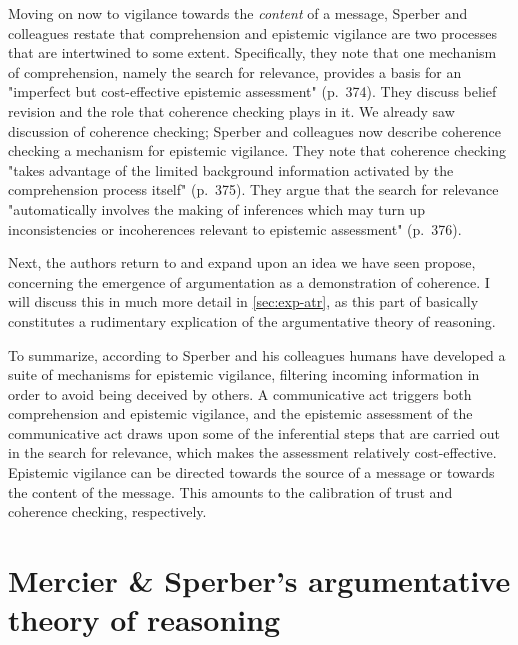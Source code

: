 
Moving on now to vigilance towards the \emph{content} of a message, Sperber and colleagues restate that comprehension and epistemic vigilance are two processes that are intertwined to some extent. Specifically, they note that one mechanism of comprehension, namely the search for relevance, provides a basis for an "imperfect but cost-effective epistemic assessment" (p.~374).
They discuss belief revision and the role that coherence checking plays in it. We already saw  discussion of coherence checking; Sperber and colleagues now describe coherence checking a mechanism for epistemic vigilance. They note that coherence checking "takes advantage of the limited background information activated by the comprehension process itself" (p.~375). They argue that the search for relevance "automatically involves the making of inferences which may turn up inconsistencies or incoherences relevant to epistemic assessment" (p.~376).

Next, the authors return to and expand upon an idea we have seen \citet{Sperber01} propose, concerning the emergence of argumentation as a demonstration of coherence. I will discuss this in much more detail in \cref{sec:exp-atr}, as this part of \citet{Sperber10} basically constitutes a rudimentary explication of the argumentative theory of reasoning.

To summarize, according to Sperber and his colleagues humans have developed a suite of mechanisms for epistemic vigilance, filtering incoming information in order to avoid being deceived by others. A communicative act triggers both comprehension and epistemic vigilance, and the epistemic assessment of the communicative act draws upon some of the inferential steps that are carried out in the search for relevance, which makes the assessment relatively cost-effective. Epistemic vigilance can be directed towards the source of a message or towards the content of the message. This amounts to the calibration of trust and coherence checking, respectively.

\section{Mercier \& Sperber's argumentative theory of reasoning}
\label{sec:MS11}


